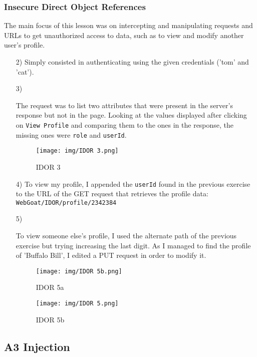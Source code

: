 \documentclass{article}
\begin{document}
\subsubsection{Insecure Direct Object References}
The main focus of this lesson was on intercepting and manipulating requests and URLs to get unauthorized access to data, such as to view and modify another user's profile.
\begin{itemize}
    \item[2)] {Simply consisted in authenticating using the given credentials ('tom' and 'cat').}
    
    \item[3)] {The request was to list two attributes that were present in the server's response but not in the page.
    Looking at the values displayed after clicking on \texttt{View Profile} and comparing them to the ones in the response, the missing ones were \texttt{role} and \texttt{userId}.
    \begin{figure}[H]
        \centering
        \texttt{[image: img/IDOR 3.png]}
        \caption{IDOR 3}
        \label{fig:idor_3}
    \end{figure}
    }
    
    \item[4)] {To view my profile, I appended the \texttt{userId} found in the previous exercise to the URL of the GET request that retrieves the profile data: \texttt{WebGoat/IDOR/profile/2342384}}
    
    \item[5)] {To view someone else's profile, I used the alternate path of the previous exercise but trying increasing the last digit.
    As I managed to find the profile of 'Buffalo Bill', I edited a PUT request in order to modify it.
    \begin{figure}[H]
        \centering
        \texttt{[image: img/IDOR 5b.png]}
        \caption{IDOR 5a}
        \label{fig:IDOR 5a}
    \end{figure}
    \begin{figure}[H]
        \centering
        \texttt{[image: img/IDOR 5.png]}
        \caption{IDOR 5b}
        \label{fig:IDOR 5b}
    \end{figure}
    }
\end{itemize}

\subsection{A3 Injection}
\end{document}
